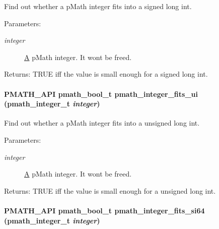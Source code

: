 Find out whether a pMath integer fits into a signed long int. 

\begin{Desc}
\item[Parameters:]
\begin{description}
\item[{\em integer}]\hyperlink{class_a}{A} pMath integer. It wont be freed. \end{description}
\end{Desc}
\begin{Desc}
\item[Returns:]TRUE iff the value is small enough for a signed long int. \end{Desc}
\hypertarget{group__numbers_gb12e5e34b7918cb6beee23c57cdd0d36}{
\paragraph[{pmath\_\-integer\_\-fits\_\-ui}]{\setlength{\rightskip}{0pt plus 5cm}PMATH\_\-API {\bf pmath\_\-bool\_\-t} pmath\_\-integer\_\-fits\_\-ui ({\bf pmath\_\-integer\_\-t} {\em integer})}\hfill}
\label{group__numbers_gb12e5e34b7918cb6beee23c57cdd0d36}


Find out whether a pMath integer fits into a unsigned long int. 

\begin{Desc}
\item[Parameters:]
\begin{description}
\item[{\em integer}]\hyperlink{class_a}{A} pMath integer. It wont be freed. \end{description}
\end{Desc}
\begin{Desc}
\item[Returns:]TRUE iff the value is small enough for a unsigned long int. \end{Desc}
\hypertarget{group__numbers_g3533b0ffc74d5cc7a0b618c5127ab5de}{
\paragraph[{pmath\_\-integer\_\-fits\_\-si64}]{\setlength{\rightskip}{0pt plus 5cm}PMATH\_\-API {\bf pmath\_\-bool\_\-t} pmath\_\-integer\_\-fits\_\-si64 ({\bf pmath\_\-integer\_\-t} {\em integer})}\hfill}
\label{group__numbers_g3533b0ffc74d5cc7a0b618c5127ab5de}


